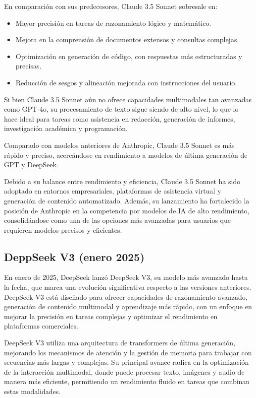 En comparación con sus predecesores, Claude 3.5 Sonnet sobresale en:

\begin{itemize}
    \item Mayor precisión en tareas de razonamiento lógico y matemático.
    \item Mejora en la comprensión de documentos extensos y consultas complejas.
    \item Optimización en generación de código, con respuestas más estructuradas y precisas.
    \item Reducción de sesgos y alineación mejorada con instrucciones del usuario.
\end{itemize}

Si bien Claude 3.5 Sonnet aún no ofrece capacidades multimodales tan avanzadas como GPT-4o, su procesamiento de texto sigue siendo de alto nivel, lo que lo hace ideal para tareas como asistencia en redacción, generación de informes, investigación académica y programación.

Comparado con modelos anteriores de Anthropic, Claude 3.5 Sonnet es más rápido y preciso, acercándose en rendimiento a modelos de última generación de GPT y DeepSeek.

Debido a su balance entre rendimiento y eficiencia, Claude 3.5 Sonnet ha sido adoptado en entornos empresariales, plataformas de asistencia virtual y generación de contenido automatizado. 
Además, su lanzamiento ha fortalecido la posición de Anthropic en la competencia por modelos de IA de alto rendimiento, consolidándose como una de las opciones más avanzadas para usuarios que requieren modelos precisos y eficientes. 

\subsection{DeppSeek V3 (enero 2025)}

En enero de 2025, DeepSeek lanzó DeepSeek V3, su modelo más avanzado hasta la fecha, que marca una evolución significativa respecto a las versiones anteriores. 
DeepSeek V3 está diseñado para ofrecer capacidades de razonamiento avanzado, generación de contenido multimodal y aprendizaje más rápido, con un enfoque en mejorar la precisión en tareas complejas y optimizar el rendimiento en plataformas comerciales.

DeepSeek V3 utiliza una arquitectura de transformers de última generación, mejorando los mecanismos de atención y la gestión de memoria para trabajar con secuencias más largas y complejas. Su principal avance radica en la optimización de la interacción multimodal, donde puede procesar texto, imágenes y audio de manera más eficiente, permitiendo un rendimiento fluido en tareas que combinan estas modalidades.

